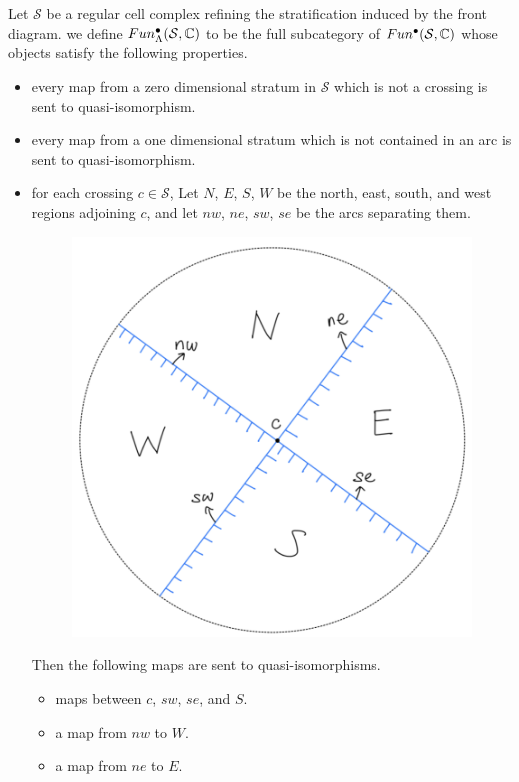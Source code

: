 \begin{definition}
Let $\mathcal{S}$ be a regular cell complex refining the stratification induced by the front diagram. we define $Fun^\bullet_\Lambda(\mathcal{S},\mathbb{C})$ to be the full subcategory of $Fun^\bullet(\mathcal{S},\mathbb{C})$ whose objects satisfy the following properties.
\begin{itemize}
\item every map from a zero dimensional stratum in $\mathcal{S}$ which is not a crossing is sent to quasi-isomorphism.

\item every map from a one dimensional stratum which is not contained in an arc is sent to quasi-isomorphism.

\item for each crossing $c\in \mathcal{S}$, Let $N$, $E$, $S$, $W$ be the north, east, south, and west regions adjoining $c$, and let $nw$, $ne$, $sw$, $se$ be the arcs separating them.
\begin{figure}[H] 
    \centering
    \includegraphics[scale = 0.55]{diagrams/intro/1.png}
    \caption{}
    \label{fig:your-label}
\end{figure}
Then the following maps are sent to quasi-isomorphisms.
\begin{itemize}
\item maps between $c$, $sw$, $se$, and $S$.
\item a map from $nw$ to $W$.
\item a map from $ne$ to $E$.
\end{itemize}


\end{itemize}
\end{definition}
